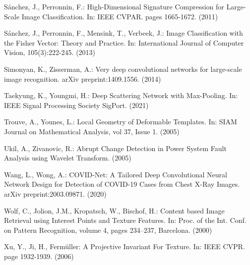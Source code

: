 \documentclass[runningheads]{llncs}
\begin{document}
\begin{thebibliography}{8}
Sánchez, J., Perronnin, F.: High-Dimensional Signature Compression for Large-Scale Image Classification. In: IEEE CVPAR. pages 1665-1672. (2011)

Sánchez, J., Perronnin, F., Mensink, T., Verbeek, J.: Image Classification with the Fisher Vector: Theory and Practice. In: International Journal of Computer Vision, 105(3):222-245. (2013)

Simonyan, K., Zisserman, A.: Very deep convolutional networks for large-scale image recognition. arXiv preprint:1409.1556. (2014)

Taekyung, K., Youngmi, H.: Deep Scattering Network with Max-Pooling. In: IEEE Signal Processing Society SigPort. (2021)

Trouve, A., Younes, L.: Local Geometry of Deformable Templates. In: SIAM Journal on Mathematical Analysis, vol 37, Issue 1. (2005)

Ukil, A., Zivanovic, R.: Abrupt Change Detection in Power System Fault Analysis using Wavelet Transform. (2005)

Wang, L., Wong, A.: COVID-Net: A Tailored Deep Convolutional Neural Network Design for Detection of COVID-19 Cases from Chest X-Ray Images. arXiv preprint:2003.09871. (2020)

Wolf, C., Jolion, J.M., Kropatsch, W., Bischof, H.: Content based Image Retrieval using Interest Points and Texture Features. In: Proc. of the Int. Conf. on Pattern Recognition, volume 4, pages 234–237, Barcelona. (2000)

Xu, Y., Ji, H., Fermüller: A Projective Invariant For Texture. In: IEEE CVPR. page 1932-1939. (2006)

\end{thebibliography}
\end{document}
